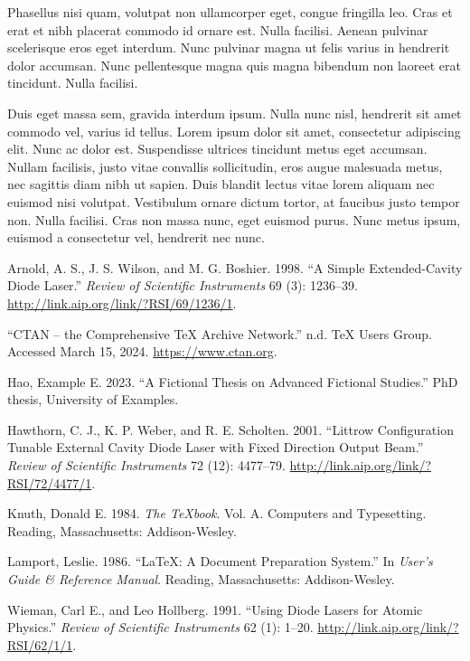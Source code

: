\documentclass{article}
\begin{document}
Phasellus nisi quam, volutpat non ullamcorper eget, congue fringilla
leo. Cras et erat et nibh placerat commodo id ornare est. Nulla
facilisi. Aenean pulvinar scelerisque eros eget interdum. Nunc pulvinar
magna ut felis varius in hendrerit dolor accumsan. Nunc pellentesque
magna quis magna bibendum non laoreet erat tincidunt. Nulla facilisi.

Duis eget massa sem, gravida interdum ipsum. Nulla nunc nisl, hendrerit
sit amet commodo vel, varius id tellus. Lorem ipsum dolor sit amet,
consectetur adipiscing elit. Nunc ac dolor est. Suspendisse ultrices
tincidunt metus eget accumsan. Nullam facilisis, justo vitae convallis
sollicitudin, eros augue malesuada metus, nec sagittis diam nibh ut
sapien. Duis blandit lectus vitae lorem aliquam nec euismod nisi
volutpat. Vestibulum ornare dictum tortor, at faucibus justo tempor non.
Nulla facilisi. Cras non massa nunc, eget euismod purus. Nunc metus
ipsum, euismod a consectetur vel, hendrerit nec nunc.

\label{refs}
\begin{CSLReferences}{1}{0}
Arnold, A. S., J. S. Wilson, and M. G. Boshier. 1998. {``A Simple
Extended-Cavity Diode Laser.''} \emph{Review of Scientific Instruments}
69 (3): 1236--39. \url{http://link.aip.org/link/?RSI/69/1236/1}.

{``CTAN -- the Comprehensive TeX Archive Network.''} n.d. TeX Users
Group. Accessed March 15, 2024. \url{https://www.ctan.org}.

Hao, Example E. 2023. {``A Fictional Thesis on Advanced Fictional
Studies.''} PhD thesis, University of Examples.

Hawthorn, C. J., K. P. Weber, and R. E. Scholten. 2001. {``Littrow
Configuration Tunable External Cavity Diode Laser with Fixed Direction
Output Beam.''} \emph{Review of Scientific Instruments} 72 (12):
4477--79. \url{http://link.aip.org/link/?RSI/72/4477/1}.

Knuth, Donald E. 1984. \emph{The TeXbook}. Vol. A. Computers and
Typesetting. Reading, Massachusetts: Addison-Wesley.

Lamport, Leslie. 1986. {``LaTeX: A Document Preparation System.''} In
\emph{User's Guide \& Reference Manual}. Reading, Massachusetts:
Addison-Wesley.

Wieman, Carl E., and Leo Hollberg. 1991. {``Using Diode Lasers for
Atomic Physics.''} \emph{Review of Scientific Instruments} 62 (1):
1--20. \url{http://link.aip.org/link/?RSI/62/1/1}.

\end{CSLReferences}
\end{document}
